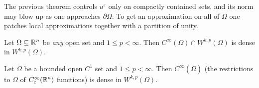 The previous theorem controls $u^\varepsilon$ only on compactly contained sets, and its norm may blow up as one approaches $\partial\Omega$. To get an approximation on all of $\Omega$ one patches local approximations together with a partition of unity.

\begin{theorem}\label{thm:meyers_serrin}
Let $\Omega\subseteq\mathbb{R}^n$ be \emph{any} open set and $1\leq p<\infty$. Then $C^\infty(\Omega)\cap W^{k,p}(\Omega)$ is dense in $W^{k,p}(\Omega)$. 
\end{theorem}

\begin{theorem}\label{thm:global_approx_C1}
Let $\Omega$ be a bounded open $C^1$ set and $1\leq p<\infty$. Then $C^\infty(\overline\Omega)$ (the restrictions to $\Omega$ of $C_c^\infty(\mathbb{R}^n)$ functions) is dense in $W^{k,p}(\Omega)$.
\end{theorem}


